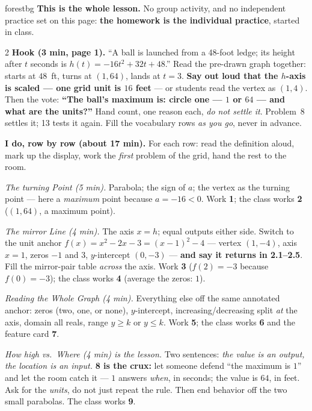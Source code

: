 \documentclass[10pt]{article}
\begin{document}
\boxguard
\begin{skillbox}{forestbg}
\textbf{This is the whole lesson.} No group activity, and no independent practice set on this
page: \textbf{the homework is the individual practice}, started in class.
\begin{multicols}{2}
\textbf{Hook (3 min, page 1).} ``A ball is launched from a 48-foot ledge; its height after $t$
seconds is $h(t)=-16t^2+32t+48$.'' Read the pre-drawn graph together: starts at $48$~ft, turns at
$(1,64)$, lands at $t=3$. \textbf{Say out loud that the $h$-axis is scaled --- one grid unit is
$16$ feet} --- or students read the vertex as $(1,4)$. Then the vote: \textbf{``The ball's maximum
is: circle one --- $1$ or $64$ --- and what are the units?''} Hand count, one reason each,
\emph{do not settle it}. Problem~8 settles it; 13 tests it again. Fill the vocabulary rows
\emph{as you go}, never in advance.

\textbf{I do, row by row (about 17 min).} For each row: read the definition aloud, mark up the
display, work the \emph{first} problem of the grid, hand the rest to the room.

\emph{The turning Point (5 min).} Parabola; the sign of $a$; the vertex as the turning point ---
here a \emph{maximum} point because $a=-16<0$. Work \textbf{1}; the class works \textbf{2}
($(1,64)$, a maximum point).

\emph{The mirror Line (4 min).} The axis $x=h$; equal outputs either side. Switch to the unit
anchor $f(x)=x^2-2x-3=(x-1)^2-4$ --- vertex $(1,-4)$, axis $x=1$, zeros $-1$ and $3$,
$y$-intercept $(0,-3)$ --- \textbf{and say it returns in 2.1--2.5}. Fill the mirror-pair table
\emph{across} the axis. Work \textbf{3} ($f(2)=-3$ because $f(0)=-3$); the class works \textbf{4}
(average the zeros: $1$).

\emph{Reading the Whole Graph (4 min).} Everything else off the same annotated anchor: zeros (two,
one, or none), $y$-intercept, increasing/decreasing split \emph{at} the axis, domain all reals,
range $y\ge k$ or $y\le k$. Work \textbf{5}; the class works \textbf{6} and the feature card
\textbf{7}.

\emph{How high vs.\ Where (4 min) is the lesson.} Two sentences: \emph{the value is an output, the
location is an input.} \textbf{8 is the crux:} let someone defend ``the maximum is $1$'' and let
the room catch it --- $1$ answers \emph{when}, in seconds; the value is $64$, in feet. Ask for the
\emph{units}, do not just repeat the rule. Then end behavior off the two small parabolas. The
class works \textbf{9}.


\end{multicols}
\end{skillbox}
\end{document}
